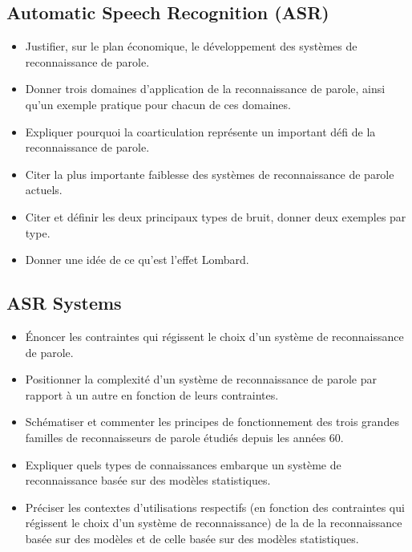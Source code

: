 \documentclass[letterpaper, 12pt]{article}
\begin{document}
	\subsection{Automatic Speech Recognition (ASR)}
		\begin{itemize}
			\setlength{\itemsep}{0pt}		
			\setlength{\parskip}{0pt}		
			\setlength{\parsep}{0pt}	
			\item Justifier, sur le plan économique, le développement des systèmes de reconnaissance de parole.
		    \item Donner trois domaines d'application de la reconnaissance de parole, ainsi qu'un exemple 
		    	pratique pour chacun de ces domaines.
		    \item Expliquer pourquoi la coarticulation représente un important défi de la reconnaissance de parole.
		    \item Citer la plus importante faiblesse des systèmes de reconnaissance de parole actuels.
		    \item Citer et définir les deux principaux types de bruit, donner deux exemples par type.
		    \item Donner une idée de ce qu'est l'effet Lombard.
		\end{itemize}
	\subsection{ASR Systems}
		\begin{itemize}
			\setlength{\itemsep}{0pt}		
			\setlength{\parskip}{0pt}		
			\setlength{\parsep}{0pt}	
			\item Énoncer les contraintes qui régissent le choix d'un système de reconnaissance de parole.
		    \item Positionner la complexité d'un système de reconnaissance de parole par rapport à un autre 
		    	en fonction de leurs contraintes.
		    \item Schématiser et commenter les principes de fonctionnement des trois grandes familles 
		    	de reconnaisseurs de parole étudiés depuis les années 60.
		    \item Expliquer quels types de connaissances embarque un système de reconnaissance basée sur 
		    	des modèles statistiques.
		    \item Préciser les contextes d'utilisations respectifs (en fonction des contraintes qui régissent 
		    	le choix d'un système de reconnaissance) de la de la reconnaissance basée sur des modèles et 
		    	de celle basée sur des modèles statistiques.
		\end{itemize}
\end{document}
